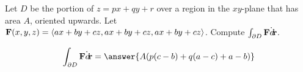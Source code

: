 \documentclass{ximera}
\author{David Guichard \and Neal Koblitz \and H. Jerome Keisler \and Albert Scheller \and Barry Balof \and Mike Wills \and Matthew Carr}
\begin{document}
\begin{exercise}




Let $D$ be the portion of $z=px+qy+r$ over a region in the $xy$-plane that has area $A$, oriented upwards. Let $\mathbf{F}(x,y,z)=\left\langle ax+by+cz,ax+by+cz,ax+by+cz\right\rangle$. Compute $\int_{\partial D}\mathbf{F}\dot{\mathop{}\!d\!}\mathbf{r}$.

\begin{prompt}
\[
\int_{\partial D}\vec{F}\dot\d\vec{r}=\answer{A(p(c-b)+q(a-c)+a-b)}
\]
\end{prompt}


\end{exercise}
\end{document}
